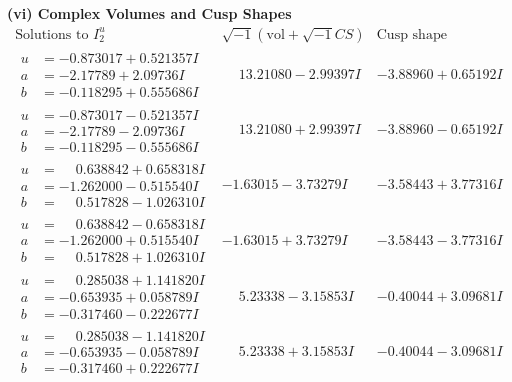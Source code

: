 \documentclass[1p]{elsarticle_modified}
\theoremstyle{definition}
\newcommand{\I}{\sqrt{-1}}
\begin{document}
\newpage\flushleft \textbf{(vi) Complex Volumes and Cusp Shapes}
$$\begin{array}{c|c|c}  
\text{Solutions to }I^u_{2}& \I (\text{vol} + \sqrt{-1}CS) & \text{Cusp shape}\\
 \hline 
\begin{aligned}
u &= -0.873017 + 0.521357 I \\
a &= -2.17789 + 2.09736 I \\
b &= -0.118295 + 0.555686 I\end{aligned}
 & \phantom{-}13.21080 - 2.99397 I & -3.88960 + 0.65192 I \\ \hline\begin{aligned}
u &= -0.873017 - 0.521357 I \\
a &= -2.17789 - 2.09736 I \\
b &= -0.118295 - 0.555686 I\end{aligned}
 & \phantom{-}13.21080 + 2.99397 I & -3.88960 - 0.65192 I \\ \hline\begin{aligned}
u &= \phantom{-}0.638842 + 0.658318 I \\
a &= -1.262000 - 0.515540 I \\
b &= \phantom{-}0.517828 - 1.026310 I\end{aligned}
 & -1.63015 - 3.73279 I & -3.58443 + 3.77316 I \\ \hline\begin{aligned}
u &= \phantom{-}0.638842 - 0.658318 I \\
a &= -1.262000 + 0.515540 I \\
b &= \phantom{-}0.517828 + 1.026310 I\end{aligned}
 & -1.63015 + 3.73279 I & -3.58443 - 3.77316 I \\ \hline\begin{aligned}
u &= \phantom{-}0.285038 + 1.141820 I \\
a &= -0.653935 + 0.058789 I \\
b &= -0.317460 - 0.222677 I\end{aligned}
 & \phantom{-}5.23338 - 3.15853 I & -0.40044 + 3.09681 I \\ \hline\begin{aligned}
u &= \phantom{-}0.285038 - 1.141820 I \\
a &= -0.653935 - 0.058789 I \\
b &= -0.317460 + 0.222677 I\end{aligned}
 & \phantom{-}5.23338 + 3.15853 I & -0.40044 - 3.09681 I \\ \hline\begin{aligned}

\end{aligned}
\end{array}$$
\end{document}
